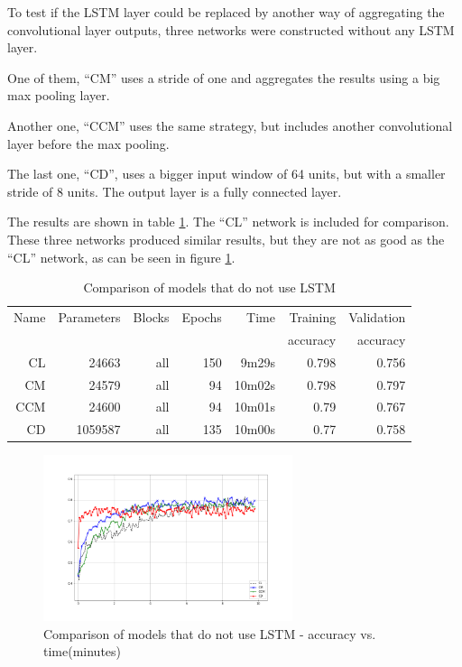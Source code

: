 To test if 
the LSTM layer could be replaced by 
another way of aggregating the convolutional layer outputs, three networks were constructed without any LSTM layer.

One of them, ``CM'' uses a stride of one and aggregates the results using a big max pooling layer.

Another one, ``CCM'' uses the same strategy, but includes another convolutional layer before the max pooling.

The last one, ``CD'', uses a bigger input window of 64 units, but with a smaller stride of 8 units. The output layer is a fully connected layer.

The results are shown in table \ref{tab:carvingnolstm}. The ``CL'' network is included for comparison.
These three networks produced similar results, but they are not as good as the ``CL'' network, as can be seen in figure
\ref{fig:nolstm}.


\begin{table}[!ht]
    \centering
    \caption[No LSTM]{Comparison of models that do not use LSTM}
    \label{tab:carvingnolstm}
\begin{tabular}{r|r|r|r|r|r|r}
\hline
Name & Parameters & Blocks & Epochs & Time & Training          & Validation          \\       
     &            &        &        &         &          accuracy &            accuracy \\ \hline\hline

CL	    & 24663	    & all	& 150	& 9m29s	    & 0.798	& 0.756 \\\hline
CM	    & 24579	    & all	& 94	& 10m02s	& 0.798	& 0.797 \\\hline
CCM	    & 24600	    & all	& 94	& 10m01s	& 0.79	& 0.767 \\\hline
CD	    & 1059587	& all	& 135	& 10m00s	& 0.77	& 0.758 \\\hline
\end{tabular}
\end{table}

\begin{figure}[htb!]
\centering\includegraphics[width=0.65\textwidth]{content/CL-CM-CCM-CD.png}
\caption[No LSTM]{\label{fig:nolstm}Comparison of models that do not use LSTM - accuracy vs. time(minutes)}%
\end{figure}

